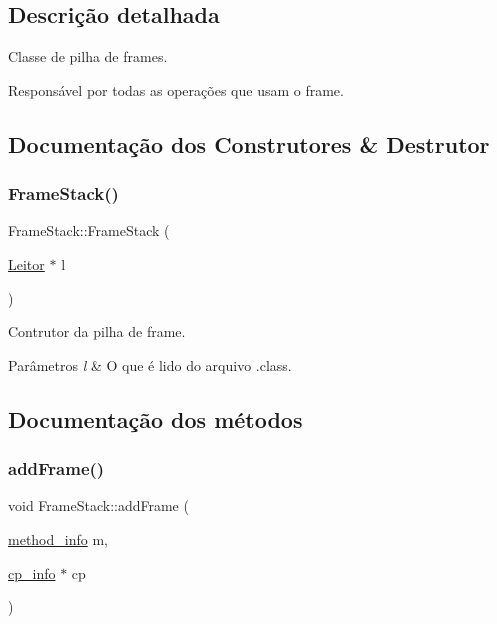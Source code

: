 \subsection{Descrição detalhada}
Classe de pilha de frames. 

Responsável por todas as operações que usam o frame. 

\subsection{Documentação dos Construtores \& Destrutor}
\mbox{\label{classFrameStack_aaa727d2a58e24e6f02f1cd358a804981}} 
\subsubsection{\texorpdfstring{Frame\+Stack()}{FrameStack()}}
{\footnotesize\ttfamily Frame\+Stack\+::\+Frame\+Stack (\begin{DoxyParamCaption}\item[{\hyperlink{classLeitor}{Leitor} $\ast$}]{l }\end{DoxyParamCaption})}



Contrutor da pilha de frame. 


\begin{DoxyParams}{Parâmetros}
{\em l} & O que é lido do arquivo .class. \\
\hline
\end{DoxyParams}


\subsection{Documentação dos métodos}
\mbox{\label{classFrameStack_aefe44d87f18ddf549ca64416569f7a40}} 
\subsubsection{\texorpdfstring{add\+Frame()}{addFrame()}}
{\footnotesize\ttfamily void Frame\+Stack\+::add\+Frame (\begin{DoxyParamCaption}\item[{\hyperlink{structmethod__info}{method\+\_\+info}}]{m,  }\item[{\hyperlink{structcp__info}{cp\+\_\+info} $\ast$}]{cp }\end{DoxyParamCaption})}



